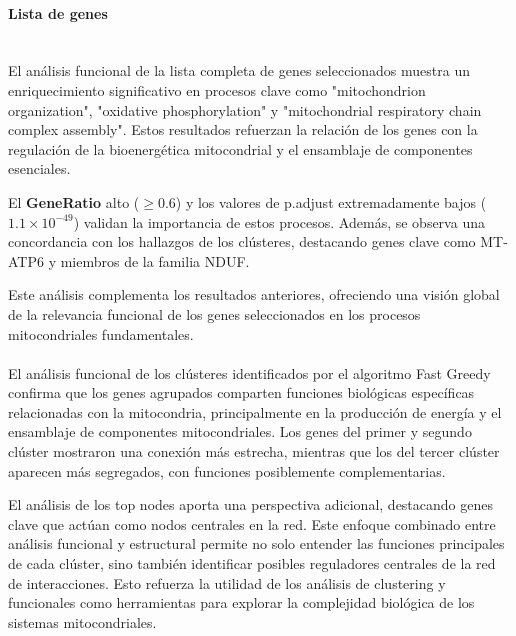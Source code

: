 \paragraph{Lista de genes} \mbox{}\\

El análisis funcional de la lista completa de genes seleccionados muestra un enriquecimiento significativo en procesos clave como "mitochondrion organization", "oxidative phosphorylation" y "mitochondrial respiratory chain complex assembly". Estos resultados refuerzan la relación de los genes con la regulación de la bioenergética mitocondrial y el ensamblaje de componentes esenciales.

El \textbf{GeneRatio} alto (\(\geq 0.6\)) y los valores de p.adjust extremadamente bajos (\( 1.1 \times 10^{-49} \)) validan la importancia de estos procesos. Además, se observa una concordancia con los hallazgos de los clústeres, destacando genes clave como MT-ATP6 y miembros de la familia NDUF.

Este análisis complementa los resultados anteriores, ofreciendo una visión global de la relevancia funcional de los genes seleccionados en los procesos mitocondriales fundamentales.

\paragraph{}

El análisis funcional de los clústeres identificados por el algoritmo Fast Greedy confirma que los genes agrupados comparten funciones biológicas específicas relacionadas con la mitocondria, principalmente en la producción de energía y el ensamblaje de componentes mitocondriales. Los genes del primer y segundo clúster mostraron una conexión más estrecha, mientras que los del tercer clúster aparecen más segregados, con funciones posiblemente complementarias.

El análisis de los top nodes aporta una perspectiva adicional, destacando genes clave que actúan como nodos centrales en la red. Este enfoque combinado entre análisis funcional y estructural permite no solo entender las funciones principales de cada clúster, sino también identificar posibles reguladores centrales de la red de interacciones. Esto refuerza la utilidad de los análisis de clustering y funcionales como herramientas para explorar la complejidad biológica de los sistemas mitocondriales.
